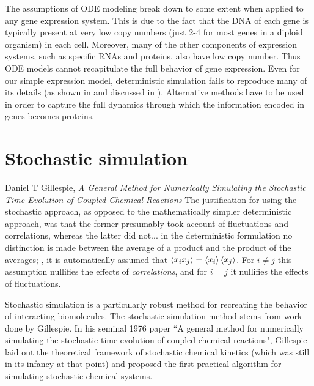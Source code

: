 The assumptions of ODE modeling break down to some extent when applied to any gene expression system. This is due to the fact that the DNA of each gene is typically present at very low copy numbers (just 2-4 for most genes in a diploid organism) in each cell. Moreover, many of the other components of expression systems, such as specific RNAs and proteins, also have low copy number. Thus ODE models cannot recapitulate the full behavior of gene expression. Even for our simple expression model, deterministic simulation fails to reproduce many of its details (as shown in  and discussed in ). Alternative methods have to be used in order to capture the full dynamics through which the information encoded in genes becomes proteins.



\section{Stochastic simulation}\label{sec:stochastic_simulation}

\begin{chapquote}{Daniel T Gillespie, \textit{A General Method for Numerically Simulating the Stochastic Time Evolution
of Coupled Chemical Reactions}\supercite{Gillespie:1976bj}}
The justification for using the stochastic approach, as opposed to the mathematically simpler deterministic approach, was that the former presumably took account of fluctuations and correlations, whereas the latter did not... in the deterministic formulation no distinction is made between the average of a product and the product of the averages; \ie, it is automatically assumed that $ \left\langle x_{i} x_{j} \right\rangle = \left\langle x_i \right\rangle \left\langle x_j \right\rangle$. For $i \neq j$ this assumption nullifies the effects of \textit{correlations}, and for $i = j$ it nullifies the effects of \textrm{fluctuations}. 
\end{chapquote}

Stochastic simulation is a particularly robust method for recreating the behavior of interacting biomolecules. The stochastic simulation method stems from work done by Gillespie. In his seminal 1976 paper ``A general method for numerically simulating the stochastic time evolution of coupled chemical reactions"\supercite{Gillespie:1976bj}, Gillespie laid out the theoretical framework of stochastic chemical kinetics (which was still in its infancy\supercite{McQuarrie:2016cc,Oppenheim:1969hr,Kurtz:2003gz} at that point) and proposed the first practical algorithm for simulating stochastic chemical systems.

